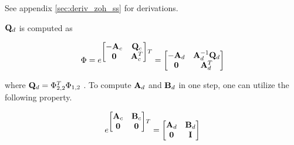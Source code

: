 See appendix \ref{sec:deriv_zoh_ss} for derivations.

$\mathbf{Q}_d$ is computed as

\begin{equation*}
  \Phi = e^{
  \begin{bmatrix}
    -\mathbf{A}_c & \mathbf{Q}_c \\
    \mathbf{0} & \mathbf{A}_c^T
  \end{bmatrix}T} =
  \begin{bmatrix}
    -\mathbf{A}_d & \mathbf{A}_d^{-1} \mathbf{Q}_d \\
    \mathbf{0} & \mathbf{A}_d^T
  \end{bmatrix}
\end{equation*}

where $\mathbf{Q}_d = \Phi_{2,2}^T \Phi_{1,2}$ \cite{bib:integral_matrix_exp}. To
compute $\mathbf{A}_d$ and $\mathbf{B}_d$ in one step, one can utilize the following
property.

\begin{equation*}
  e^{
  \begin{bmatrix}
    \mathbf{A}_c & \mathbf{B}_c \\
    \mathbf{0} & \mathbf{0}
  \end{bmatrix}T} =
  \begin{bmatrix}
    \mathbf{A}_d & \mathbf{B}_d \\
    \mathbf{0} & \mathbf{I}
  \end{bmatrix}
\end{equation*}
